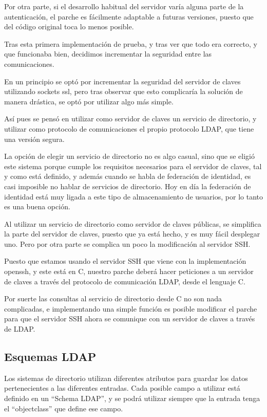     Por otra parte, si el desarrollo habitual del servidor varía alguna
    parte de la autenticación, el parche es fácilmente adaptable a futuras
    versiones, puesto que del código original toca lo menos posible.

    Tras esta primera implementación de prueba, y tras ver que todo era
    correcto, y que funcionaba bien, decidimos incrementar la seguridad
    entre las comunicaciones.

    En un principio se optó por incrementar la seguridad del servidor de
    claves utilizando sockets ssl, pero tras observar que esto complicaría
    la solución de manera drástica, se optó por utilizar algo más simple.

    Así pues se pensó en utilizar como servidor de claves un servicio de
    directorio, y utilizar como protocolo de comunicaciones el propio
    protocolo LDAP, que tiene una versión segura.

    La opción de elegir un servicio de directorio no es algo casual, sino
    que se eligió este sistema porque cumple los requisitos necesarios para
    el servidor de claves, tal y como está definido, y además cuando se
    habla de federación de identidad, es casi imposible no hablar de
    servicios de directorio. Hoy en día la federación de identidad está muy
    ligada a este tipo de almacenamiento de usuarios, por lo tanto es una
    buena opción.

    Al utilizar un servicio de directorio como servidor de claves públicas,
    se simplifica la parte del servidor de claves, puesto que ya está
    hecho, y es muy fácil desplegar uno. Pero por otra parte se complica un
    poco la modificación al servidor SSH.

    Puesto que estamos usando el servidor SSH que viene con la
    implementación openssh, y este está en C, nuestro parche deberá hacer
    peticiones a un servidor de claves a través del protocolo de
    comunicación LDAP, desde el lenguaje C.

    Por suerte las consultas al servicio de directorio desde C no son nada
    complicadas, e implementando una simple función es posible modificar el
    parche para que el servidor SSH ahora se comunique con un servidor de
    claves a través de LDAP.

    \subsection{Esquemas LDAP}

    Los sistemas de directorio utilizan diferentes atributos para guardar los
    datos pertenecientes a las diferentes entradas. Cada posible campo a
    utilizar está definido en un ``Schema LDAP'', y se podrá utilizar
    siempre que la entrada tenga el ``objectclass'' que define ese campo.


